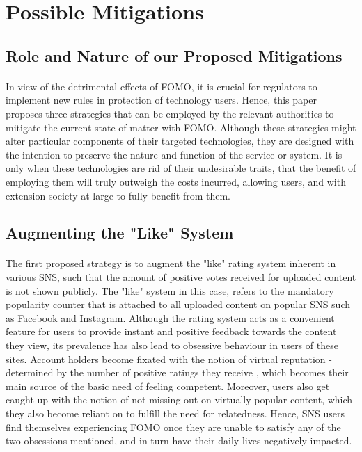 \section{Possible Mitigations}
 \subsection{Role and Nature of our Proposed Mitigations}
  \paragraph{}
        In view of the detrimental effects of FOMO, it is crucial for regulators to implement new rules in protection of technology users. Hence, this paper proposes three strategies that can be employed by the relevant authorities to mitigate the current state of matter with FOMO. Although these strategies might alter particular components of their targeted technologies, they are designed with the intention to preserve the nature and function of the service or system. It is only when these technologies are rid of their undesirable traits, that the benefit of employing them will truly outweigh the costs incurred, allowing users, and with extension society at large to fully benefit from them.
 \subsection{Augmenting the "Like" System}
  \paragraph{}        
        The first proposed strategy is to augment the "like" rating system inherent in various SNS, such that the amount of positive votes received for uploaded content is not shown publicly. The "like" system in this case, refers to the mandatory popularity counter that is attached to all uploaded content on popular SNS such as Facebook and Instagram. Although the rating system acts as a convenient feature for users to provide instant and positive feedback towards the content they view, its prevalence has also lead to obsessive behaviour in users of these sites. Account holders become fixated with the notion of virtual reputation \cite{breslin2009social} - determined by the number of positive ratings they receive , which becomes their main source of the basic need of feeling competent. Moreover, users also get caught up with the notion of not missing out on virtually popular content, which they also become reliant on to fulfill the need for relatedness. Hence, SNS users find themselves experiencing FOMO once they are unable to satisfy any of the two obsessions mentioned, and in turn have their daily lives negatively impacted. 
